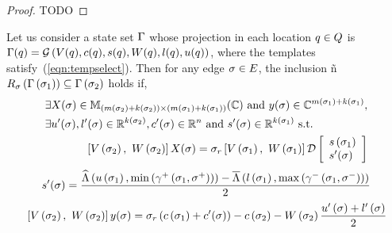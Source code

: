 \begin{proof}
{\color{red} TODO}
\end{proof}

\begin{lemma}
  Let us consider a state set $\Gamma$ whose projection in each
  location $q\in Q$ is $\Gamma(q)
  = \mathcal{G}\left(V(q),c(q),s(q),W(q),l(q),u(q)\right)$, where
  the templates satisfy~(\ref{eqn:tempselect}).  Then for any
  edge $\sigma\in E$, the inclusion
  ñ$R_{\sigma}\left(\Gamma\left(\sigma_{1}\right)\right) \subseteq \Gamma\left(\sigma_{2}\right)$
  holds if,
\begin{align}
\begin{split}
& \exists X(\sigma)\in
\mathbb{M}_{\left(m\left(\sigma_{2}\right)+k\left(\sigma_{2}\right)\right)\times \left(m\left(\sigma_{1}\right)+k\left(\sigma_{1}\right)\right)}(\mathbb{\mathbb{C}})~\text{and}~y(\sigma)\in
\mathbb{C}^{m\left(\sigma_{1}\right)+k\left(\sigma_{1}\right)},\\
& \exists u^\prime(\sigma),l^\prime(\sigma)\in \mathbb{R}^{k\left(\sigma_{2}\right)}, c^\prime(\sigma)\in\mathbb{R}^n~\text{and}~s^\prime(\sigma)\in\mathbb{R}^{k\left(\sigma_{1}\right)}~\text{s.t.}
\end{split}\\
\begin{split}
& \left[V\left(\sigma_{2}\right),~W\left(\sigma_{2}\right)\right]X(\sigma) = \sigma_r\left[V\left(\sigma_{1}\right),~W\left(\sigma_{1}\right)\right]\mathcal{D}
\left[\begin{array}{l}{s\left(\sigma_{1}\right)}\\{s^\prime(\sigma)} \end{array}\right]\\
\end{split}
\end{align}
\begin{align}
\begin{split}
s^\prime(\sigma) = \frac{\widehat{\Lambda}\left(u\left(\sigma_{1}\right),\min\left(\gamma^+\left(\sigma_{1},\sigma^+\right)\right)\right)-
\overline{\Lambda}\left(l\left(\sigma_{1}\right),\max\left(\gamma^-\left(\sigma_{1},\sigma^-\right)\right)\right)}{2}\\
\end{split}
\end{align}
\begin{align}
\begin{split}
& \left[V\left(\sigma_{2}\right),~W\left(\sigma_{2}\right)\right]y(\sigma) = \sigma_r\left(c\left(\sigma_{1}\right)+c^\prime(\sigma)\right)- 
c\left(\sigma_{2}\right) - W\left(\sigma_{2}\right)\frac{u^\prime\left(\sigma\right)+l^\prime\left(\sigma\right)}{2}\\
\end{split}
\end{align}

\end{lemma}
